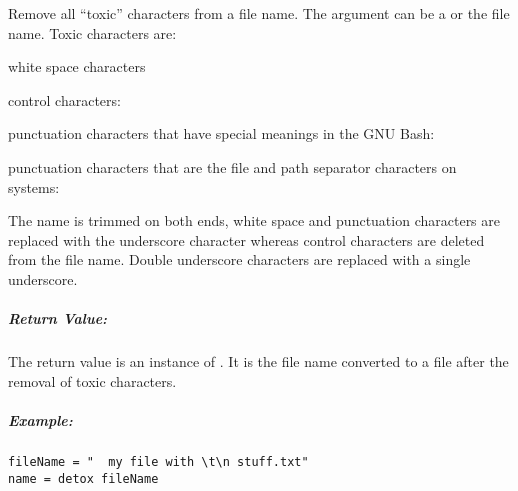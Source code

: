 \label{par:detox}

Remove all ``toxic'' characters from a file name. The  argument
can be a  or the file name. Toxic characters are:
\begin{compactitem}
\item white space characters 
\item control characters: 
\item punctuation characters that have special meanings in the GNU Bash: \code{["'`]}
\item punctuation characters that are the file and path separator characters on systems: \code{[/\textbackslash;:]}
\end{compactitem}

The name is trimmed on both ends, white space and punctuation characters are replaced with the underscore character \codequoted{\_}
whereas control characters are deleted from the file name. Double underscore characters are replaced with a single
underscore.

\subparagraph{Return Value:}

The return value is an instance of . It is the file name converted
to a file after the removal of toxic characters.

\subparagraph{Example:}

\begin{lstlisting}[style=Groovybash, label={lst:example_cd}]
fileName = "  my file with \t\n stuff.txt"
name = detox fileName
\end{lstlisting}

